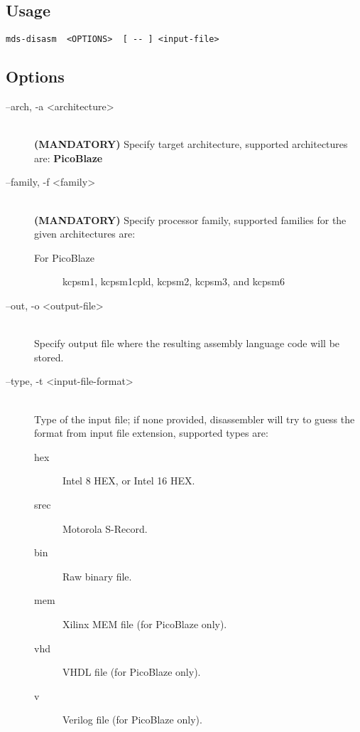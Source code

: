     \subsection{Usage}
        \verb'mds-disasm  <OPTIONS>  [ -- ] <input-file>'

    \subsection{Options}
        \begin{description}
            \item[--arch, -a <architecture>]~\\
                \textbf{(MANDATORY)} Specify target architecture, supported architectures are: \textbf{PicoBlaze}

            \item[--family, -f <family>]~\\
                \textbf{(MANDATORY)} Specify processor family, supported families for the given architectures are:
                \begin{description}
                    \item[For PicoBlaze]
                        kcpsm1, kcpsm1cpld, kcpsm2, kcpsm3, and kcpsm6
                \end{description}

            \item[--out, -o <output-file>]~\\
                Specify output file where the resulting assembly language code will be stored.

            \item[--type, -t <input-file-format>]~\\
                Type of the input file; if none provided, disassembler will try to guess the format from input file extension, supported types are:
                \begin{description}
                    \item [hex] Intel 8 HEX, or Intel 16 HEX.
                    \item [srec] Motorola S-Record.
                    \item [bin] Raw binary file.
                    \item [mem] Xilinx MEM file (for PicoBlaze only).
                    \item [vhd] VHDL file (for PicoBlaze only).
                    \item [v] Verilog file (for PicoBlaze only).
                \end{description}


\end{description}
